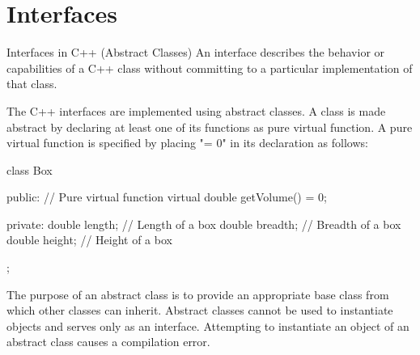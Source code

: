 \documentclass[../lecture5-objectorientation.tex]{subfiles}
\begin{document}
\section{Interfaces}


\begin{frame}[fragile]{Interfaces in C++ (Abstract Classes)}
    An interface describes the behavior or capabilities of a C++ class without committing to a particular implementation of that class. \newline

    The C++ interfaces are implemented using abstract classes. A class is made abstract by declaring at least one of its functions as pure virtual function. A pure virtual function is specified by placing "= 0" in its declaration as follows: \newline

    \begin{cppcode}[lastline=11]
class Box
{
    public:
        // Pure virtual function
        virtual double getVolume() = 0;

    private:
        double length;  // Length of a box
        double breadth; // Breadth of a box
        double height;  // Height of a box
};
    \end{cppcode}

    The purpose of an abstract class is to provide an appropriate base class from which other classes can inherit. Abstract classes cannot be used to instantiate objects and serves only as an interface. Attempting to instantiate an object of an abstract class causes a compilation error.
\end{frame}

\end{document}
